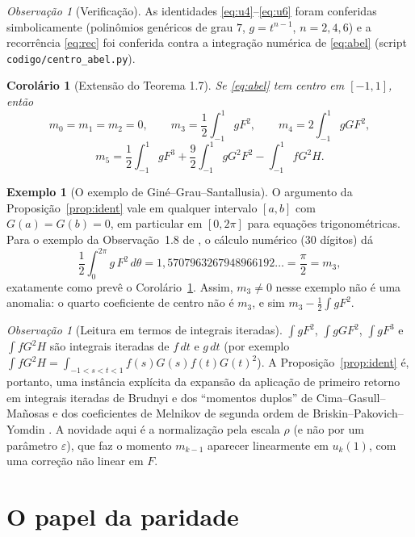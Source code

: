 \documentclass[11pt]{article}
\theoremstyle{plain}
\newtheorem{corollary}[theorem]{Corolário}
\theoremstyle{definition}
\newtheorem{example}[theorem]{Exemplo}
\theoremstyle{remark}
\newtheorem{remark}[theorem]{Observação}
\begin{document}
\begin{remark}[Verificação]
As identidades \eqref{eq:u4}--\eqref{eq:u6} foram conferidas simbolicamente
(polinômios genéricos de grau $7$, $g=t^{n-1}$, $n=2,4,6$) e a recorrência
\eqref{eq:rec} foi conferida contra a integração numérica de \eqref{eq:abel}
(script \texttt{codigo/centro\_abel.py}).
\end{remark}

\begin{corollary}[Extensão do Teorema 1.7]\label{cor:17}
Se \eqref{eq:abel} tem centro em $[-1,1]$, então
\[
 m_0=m_1=m_2=0,\qquad m_3=\frac12\int_{-1}^1gF^2,\qquad m_4=2\int_{-1}^1gGF^2,
\]
\[
 m_5=\frac12\int_{-1}^1 gF^3+\frac92\int_{-1}^1 gG^2F^2-\int_{-1}^1 fG^2H .
\]
\end{corollary}

\begin{example}[O exemplo de Giné--Grau--Santallusia]
O argumento da Proposição~\ref{prop:ident} vale em qualquer intervalo $[a,b]$
com $G(a)=G(b)=0$, em particular em $[0,2\pi]$ para equações trigonométricas.
Para o exemplo da Observação~1.8 de \cite{ALA20}, o cálculo numérico (30 dígitos)
dá
\[
 \frac12\int_0^{2\pi} g\,F^2\,d\theta=1{,}5707963267948966192\ldots=\frac\pi2=m_3,
\]
exatamente como prevê o Corolário~\ref{cor:17}. Assim, $m_3\neq0$ nesse exemplo
não é uma anomalia: o quarto coeficiente de centro não é $m_3$, e sim
$m_3-\frac12\int gF^2$.
\end{example}

\begin{remark}[Leitura em termos de integrais iteradas]
$\int gF^2$, $\int gGF^2$, $\int gF^3$ e $\int fG^2H$ são integrais iteradas de
$f\,dt$ e $g\,dt$ (por exemplo $\int fG^2H=\int_{-1<s<t<1}f(s)G(s)f(t)G(t)^2$).
A Proposição~\ref{prop:ident} é, portanto, uma instância explícita da expansão
da aplicação de primeiro retorno em integrais iteradas de Brudnyi \cite{Bru06} e
dos ``momentos duplos'' de Cima--Gasull--Mañosas \cite{CGM13a} e dos
coeficientes de Melnikov de segunda ordem de Briskin--Pakovich--Yomdin
\cite{BPY16}. A novidade aqui é a normalização pela escala $\rho$ (e não por um
parâmetro $\varepsilon$), que faz o momento $m_{k-1}$ aparecer linearmente em
$u_k(1)$, com uma correção não linear em $F$.
\end{remark}

\section{O papel da paridade}\label{sec:paridade}
\end{document}
